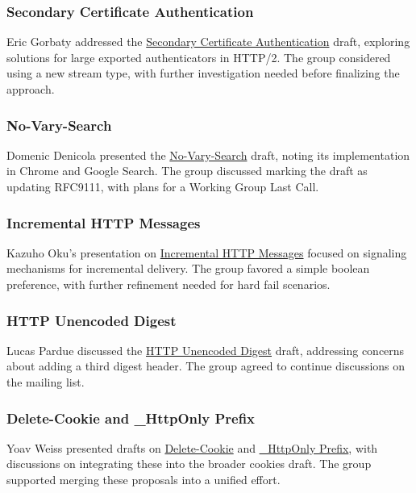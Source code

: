 \documentclass{article}
\begin{document}
\subsubsection{Secondary Certificate Authentication}
Eric Gorbaty addressed the \href{https://datatracker.ietf.org/doc/html/draft-ietf-httpbis-secondary-server-certs}{Secondary Certificate Authentication} draft, exploring solutions for large exported authenticators in HTTP/2. The group considered using a new stream type, with further investigation needed before finalizing the approach.

\subsubsection{No-Vary-Search}
Domenic Denicola presented the \href{https://datatracker.ietf.org/doc/html/draft-ietf-httpbis-no-vary-search}{No-Vary-Search} draft, noting its implementation in Chrome and Google Search. The group discussed marking the draft as updating RFC9111, with plans for a Working Group Last Call.

\subsubsection{Incremental HTTP Messages}
Kazuho Oku's presentation on \href{https://datatracker.ietf.org/doc/html/draft-kazuho-httpbis-incremental-http}{Incremental HTTP Messages} focused on signaling mechanisms for incremental delivery. The group favored a simple boolean preference, with further refinement needed for hard fail scenarios.

\subsubsection{HTTP Unencoded Digest}
Lucas Pardue discussed the \href{https://datatracker.ietf.org/doc/html/draft-pardue-httpbis-identity-digest}{HTTP Unencoded Digest} draft, addressing concerns about adding a third digest header. The group agreed to continue discussions on the mailing list.

\subsubsection{Delete-Cookie and \_HttpOnly Prefix}
Yoav Weiss presented drafts on \href{https://datatracker.ietf.org/doc/html/draft-deletecookie-weiss-http}{Delete-Cookie} and \href{https://datatracker.ietf.org/doc/html/draft-httponlyprefix-weiss-http}{\_HttpOnly Prefix}, with discussions on integrating these into the broader cookies draft. The group supported merging these proposals into a unified effort.
\end{document}
